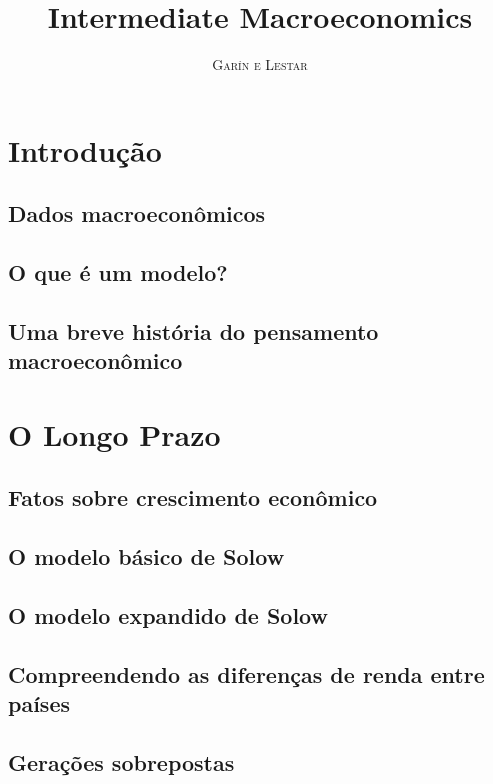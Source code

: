 \documentclass[a4paper,11pt]{book}
\title{\Huge \textbf{Intermediate Macroeconomics} \\ 
\huge }
\author{\textsc{Garín e Lestar}}
\theoremstyle{definition}
\begin{document}
\frontmatter
\maketitle

\tableofcontents

\mainmatter

\part{Introdução}

\chapter{Dados macroeconômicos}
\chapter{O que é um modelo?}
\chapter{Uma breve história do pensamento macroeconômico}

\part{O Longo Prazo}

\chapter{Fatos sobre crescimento econômico}
\chapter{O modelo básico de Solow}
\chapter{O modelo expandido de Solow}
\chapter{Compreendendo as diferenças de renda entre países}
\chapter{Gerações sobrepostas}
\end{document}
